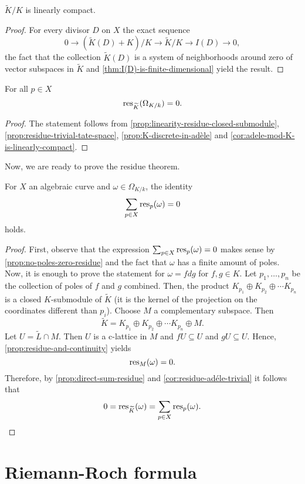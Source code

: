 \begin{corollary}\label{cor:adele-mod-K-is-linearly-compact}
	$\widetilde{K}/K$ is linearly compact.
\end{corollary}
\begin{proof}
	For every divisor $D$ on $X$ the exact sequence
	\[
	0 \to (\widetilde{K}(D) + K)/ K \to \widetilde{K}/K \to I(D) \to 0,
	\]
	the fact that the collection $\widetilde{K}(D)$ is a system of neighborhoods around zero of vector subspaces in $\widetilde{K}$ and \cref{thm:I(D)-is-finite-dimensional} yield the result.
\end{proof}
\begin{corollary}\label{cor:residue-adéle-trivial}
	For all $p\in X$
	\[
		\operatorname{res}_{\widetilde{K}}(\Omega_{K/k}) = 0.
	\]
\end{corollary}
\begin{proof}
	The statement follows from \cref{prop:linearity-residue-closed-submodule}, \cref{prop:residue-trivial-tate-space}, \cref{prop:K-discrete-in-adèle} and \cref{cor:adele-mod-K-is-linearly-compact}.
\end{proof}

Now, we are ready to prove the residue theorem. 
\begin{theorem}\label{thm:residue-theorem}
	For $X$ an algebraic curve and $\omega \in \Omega_{K/k}$, the identity 
	\[
		\sum_{p\in X}\operatorname{res}_{p}(\omega) = 0
	\]
	holds. 
\end{theorem}
\begin{proof}
	First, observe that the expression $\sum_{p\in X}\operatorname{res}_{p}(\omega) = 0$ makes sense by \cref{prop:no-poles-zero-residue} and the fact that $\omega$ has a finite amount of poles. Now, it is enough to prove the statement for $\omega = fdg$ for $f,g \in K$. Let $p_{1}, \ldots, p_{n}$ be the collection of poles of $f$ and $g$ combined. Then, the product $K_{p_{1}} \oplus K_{p_{2}} \oplus \cdots K_{p_{n}}$ is a closed $K$-submodule of $\widetilde{K}$ (it is the kernel of the projection on the coordinates different than $p_{i}$). Choose $M$ a complementary subspace. Then
	\[
		\widetilde{K} = K_{p_{1}} \oplus K_{p_{2}} \oplus \cdots K_{p_{n}} \oplus M. 
	\] 
	Let $U = \widetilde{L} \cap M$. Then $U$ is a c-lattice in $M$ and $fU \subseteq U$ and $gU \subseteq U$. Hence, \cref{prop:residue-and-continuity} yields
	\[
		\operatorname{res}_{M}(\omega) = 0.
	\]
	Therefore, by \cref{prop:direct-sum-residue} and \cref{cor:residue-adéle-trivial} it follows that
	\[
		0 = \operatorname{res}_{\widetilde{K}}(\omega) = \sum_{p\in X}\operatorname{res}_{p}(\omega).
	\]
\end{proof}
\section{Riemann-Roch formula}
